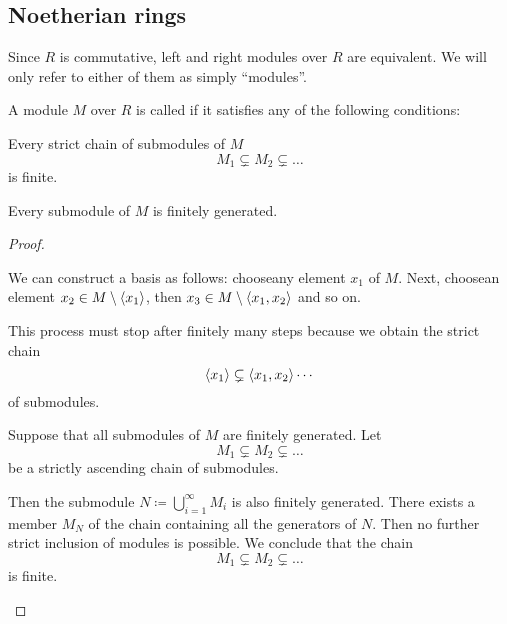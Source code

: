 \subsection{Noetherian rings}\label{subsec:noetherian_rings}

\begin{remark}\label{remark:commutative_modules}
  Since \( R \) is commutative, left and right modules over \( R \) are equivalent. We will only refer to either of them as simply \enquote{modules}.
\end{remark}

\begin{definition}\label{def:noetherian_module}\cite[proposition 8.30]{Knapp2016BAlg}
  A module \( M \) over \( R \) is called  if it satisfies any of the following conditions:
  \begin{defenum}
     Every strict chain of submodules of \( M \)
    \begin{equation*}
      M_1 \subsetneq M_2 \subsetneq \ldots
    \end{equation*}
    is finite.

     Every submodule of \( M \) is finitely generated.
  \end{defenum}
\end{definition}
\begin{proof}
  \begin{description}
     We can construct a basis as follows: choose\AOC any element \( x_1 \) of \( M \). Next, choose\AOC an element \( x_2 \in M \setminus \left\langle x_1 \right\rangle \), then \( x_3 \in M \setminus \left\langle x_1, x_2 \right\rangle \) and so on.

    This process must stop after finitely many steps because we obtain the strict chain
    \begin{equation*}
      \left\langle x_1 \right\rangle \subsetneq \left\langle x_1, x_2 \right\rangle \cdots
    \end{equation*}
    of submodules.

     Suppose that all submodules of \( M \) are finitely generated. Let
    \begin{equation*}
      M_1 \subsetneq M_2 \subsetneq \ldots
    \end{equation*}
    be a strictly ascending chain of submodules.

    Then the submodule \( N \coloneqq \bigcup_{i=1}^\infty M_i \) is also finitely generated. There exists a member \( M_N \) of the chain containing all the generators of \( N \). Then no further strict inclusion of modules is possible. We conclude that the chain
    \begin{equation*}
      M_1 \subsetneq M_2 \subsetneq \ldots
    \end{equation*}
    is finite.
  \end{description}
\end{proof}

